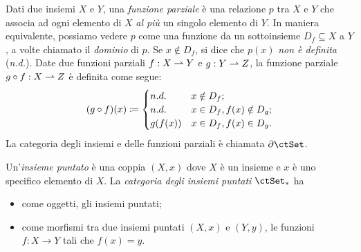 \begin{example}\label{ex_cat_pfun}
	Dati due insiemi \(X\) e \(Y\), una \emph{funzione parziale} è una relazione \(p\) tra \(X\) e \(Y\) che associa ad ogni elemento di \(X\) \emph{al più} un singolo elemento di \(Y\). In maniera equivalente, possiamo vedere \(p\) come una funzione da un sottoinsieme \(D_f\subseteq X\) a \(Y\), a volte chiamato il \emph{dominio} di \(p\). Se \(x\notin D_f\), si dice che \(p(x)\) \emph{non è definita} (\emph{n.d.}).
	Date due funzioni parziali \(f:X\rightharpoonup Y\) e \(g:Y\rightharpoonup Z\), la funzione parziale \(g\circ f:X\rightharpoonup Z\) è definita come segue:
	\[
		(g\circ f) (x) \coloneqq \begin{cases}
			n.d.    & x\notin D_f ;              \\
			n.d.    & x\in D_f, f(x)\notin D_g ; \\
			g(f(x)) & x\in D_f, f(x)\in D_g .
		\end{cases}
	\]
	La categoria degli insiemi e delle funzioni parziali è chiamata \(\pSet\).
\end{example}
\begin{example}\label{ex_cat_puntati}
	Un'\emph{insieme puntato} è una coppia \((X,x)\) dove \(X\) è un insieme e \(x\) è uno specifico elemento di \(X\).
	La \emph{categoria degli insiemi puntati} \(\ctSet_*\) ha
	\begin{itemize}
		\item come oggetti, gli insiemi puntati;
		\item come morfismi tra due insiemi puntati \((X,x)\) e \((Y,y)\), le funzioni \(f:X\to Y\) tali che \(f(x)=y\).
	\end{itemize}
\end{example}
